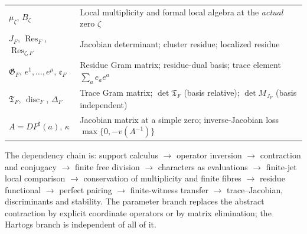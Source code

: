 \documentclass[11pt,letterpaper]{article}
\theoremstyle{definition}
\theoremstyle{remark}
\newcommand{\sh}{^{\sharp}}
\newcommand{\Gram}{\mathfrak G}
\newcommand{\TGram}{\mathfrak T}
\newcommand{\Eul}{\mathfrak e}
\DeclareMathOperator{\Res}{Res}
\DeclareMathOperator{\disc}{disc}
\numberwithin{equation}{section}
\begin{document}
\begin{center}
\begin{longtable}{@{}L{0.26\textwidth}L{0.66\textwidth}@{}}
$\mu_\zeta$, $B_\zeta$ & Local multiplicity and formal local algebra at the \emph{actual} zero $\zeta$\\[0.25em]
$J_F$, $\Res_F$, $\Res_{\zeta,F}$ & Jacobian determinant; cluster residue; localized residue\\[0.25em]
$\Gram_F$, $e^1,\ldots,e^\mu$, $\Eul_F$ & Residue Gram matrix; residue-dual basis; trace element $\sum_ae_ae^a$\\[0.25em]
$\TGram_F$, $\disc_F$, $\Delta_F$ & Trace Gram matrix; $\det\TGram_F$ (basis relative); $\det M_{J_F}$ (basis independent)\\[0.25em]
$A=DF\sh(a)$, $\kappa$ & Jacobian matrix at a simple zero; inverse-Jacobian loss $\max\{0,-v(A^{-1})\}$\\
\bottomrule
\end{longtable}
\end{center}

The dependency chain is: support calculus $\to$ operator inversion $\to$ contraction and conjugacy $\to$ finite free division $\to$ characters as evaluations $\to$ finite-jet local comparison $\to$ conservation of multiplicity and finite fibres $\to$ residue functional $\to$ perfect pairing $\to$ finite-witness transfer $\to$ trace--Jacobian, discriminants and stability. The parameter branch replaces the abstract contraction by explicit coordinate operators or by matrix elimination; the Hartogs branch is independent of all of it.
\end{document}
